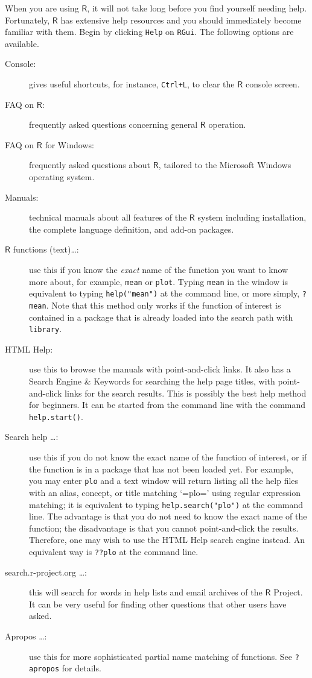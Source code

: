 \documentclass[captions=tableheading]{scrbook}
\begin{document}
When you are using \(\mathsf{R}\), it will not take long before you find yourself needing help. Fortunately, \(\mathsf{R}\) has extensive help resources and you should immediately become familiar with them. Begin by clicking \texttt{Help} on \texttt{RGui}. The following options are available. 
\begin{description}
\item[Console:] gives useful shortcuts, for instance, \texttt{Ctrl+L}, to clear the \(\mathsf{R}\) console screen.
\item[FAQ on \(\mathsf{R}\):] frequently asked questions concerning general \(\mathsf{R}\) operation.
\item[FAQ on \(\mathsf{R}\) for Windows:] frequently asked questions about \(\mathsf{R}\), tailored to the Microsoft Windows operating system.
\item[Manuals:] technical manuals about all features of the \(\mathsf{R}\) system including installation, the complete language definition, and add-on packages.
\item[\(\mathsf{R}\) functions (text)\ldots{}:] use this if you know the \emph{exact} name of the function you want to know more about, for example, \texttt{mean} or \texttt{plot}. Typing \texttt{mean} in the window is equivalent to typing \texttt{help("mean")} at the command line, or more simply, \texttt{?mean}. Note that this method only works if the function of interest is contained in a package that is already loaded into the search path with \texttt{library}.
\item[HTML Help:] use this to browse the manuals with point-and-click links. It also has a Search Engine \& Keywords for searching the help page titles, with point-and-click links for the search results. This is possibly the best help method for beginners. It can be started from the command line with the command \texttt{help.start()}.
\item[Search help \ldots{}:] use this if you do not know the exact name of the function of interest, or if the function is in a package that has not been loaded yet. For example, you may enter \texttt{plo} and a text window will return listing all the help files with an alias, concept, or title matching `=plo=' using regular expression matching; it is equivalent to typing \texttt{help.search("plo")} at the command line. The advantage is that you do not need to know the exact name of the function; the disadvantage is that you cannot point-and-click the results. Therefore, one may wish to use the HTML Help search engine instead. An equivalent way is \texttt{??plo} at the command line.
\item[search.r-project.org \ldots{}:] this will search for words in help lists and email archives of the \(\mathsf{R}\) Project. It can be very useful for finding other questions that other users have asked.
\item[Apropos \ldots{}:] use this for more sophisticated partial name matching of functions. See \texttt{?apropos} for details.
\end{description}
\end{document}
